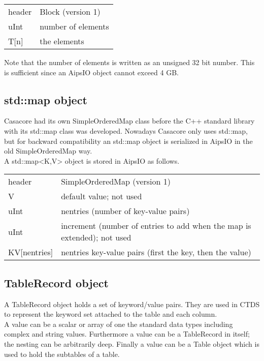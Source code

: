 \vspace{0.15in}
\begin{tabular}{|l|p{13cm}|} \hline
  header & Block (version 1) \\
  uInt & number of elements \\
  T[n] & the elements \\
  \hline
\end{tabular}
\vspace{0.15in}

Note that the number of elements is written as an unsigned 32 bit
number.
This is sufficient since an AipsIO object cannot exceed 4 GB.


\subsection{\label{CTDS:MAP}std::map object}
Casacore had its own SimpleOrderedMap class before the C++ standard
library with its std::map class was developed. Nowadays Casacore only
uses std::map, but for backward compatibility an std::map object is
serialized in AipsIO in the old SimpleOrderedMap way.
\\A std::map<K,V> object is stored in AipsIO as follows.

\vspace{0.15in}
\begin{tabular}{|l|p{13cm}|} \hline
  header & SimpleOrderedMap (version 1) \\
  V & default value; not used\\
  uInt & nentries (number of key-value pairs) \\
  uInt & increment (number of entries to add when the map is
         extended); not used \\
  KV[nentries] & nentries key-value pairs (first the key, then the value) \\
  \hline
\end{tabular}
\vspace{0.15in}

 
\subsection{\label{CTDS:TABLERECORD}TableRecord object}
A TableRecord object holds a set of keyword/value pairs. They are used
in CTDS to represent the keyword set attached to the table and each column.
\\A value can be a scalar or array of one the standard data types including
complex and string values. Furthermore a value can be a TableRecord in
itself; the nesting can be arbitrarily deep. Finally a value can be
a Table object which is used to hold the subtables of a table.

